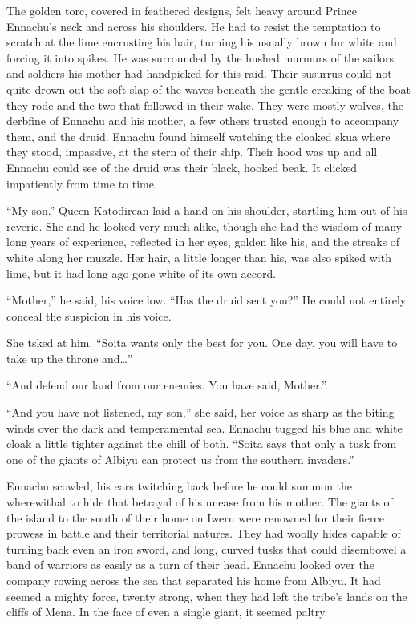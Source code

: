 The golden torc, covered in feathered designs, felt heavy around Prince Ennachu's neck and across his shoulders. He had to resist the temptation to scratch at the lime encrusting his hair, turning his usually brown fur white and forcing it into spikes. He was surrounded by the hushed murmurs of the sailors and soldiers his mother had handpicked for this raid. Their susurrus could not quite drown out the soft slap of the waves beneath the gentle creaking of the boat they rode and the two that followed in their wake. They were mostly wolves, the derbfine of Ennachu and his mother, a few others trusted enough to accompany them, and the druid. Ennachu found himself watching the cloaked skua where they stood, impassive, at the stern of their ship. Their hood was up and all Ennachu could see of the druid was their black, hooked beak. It clicked impatiently from time to time.

``My son.'' Queen Katodirean laid a hand on his shoulder, startling him out of his reverie. She and he looked very much alike, though she had the wisdom of many long years of experience, reflected in her eyes, golden like his, and the streaks of white along her muzzle. Her hair, a little longer than his, was also spiked with lime, but it had long ago gone white of its own accord.

``Mother,'' he said, his voice low. ``Has the druid sent you?'' He could not entirely conceal the suspicion in his voice.

She tsked at him. ``Soita wants only the best for you. One day, you will have to take up the throne and\ldots''

``And defend our land from our enemies. You have said, Mother.''

``And you have not listened, my son,'' she said, her voice as sharp as the biting winds over the dark and temperamental sea. Ennachu tugged his blue and white cloak a little tighter against the chill of both. ``Soita says that only a tusk from one of the giants of Albiyu can protect us from the southern invaders.''

Ennachu scowled, his ears twitching back before he could summon the wherewithal to hide that betrayal of his unease from his mother. The giants of the island to the south of their home on Iweru were renowned for their fierce prowess in battle and their territorial natures. They had woolly hides capable of turning back even an iron sword, and long, curved tusks that could disembowel a band of warriors as easily as a turn of their head. Ennachu looked over the company rowing across the sea that separated his home from Albiyu. It had seemed a mighty force, twenty strong, when they had left the tribe's lands on the cliffs of Mena. In the face of even a single giant, it seemed paltry.

